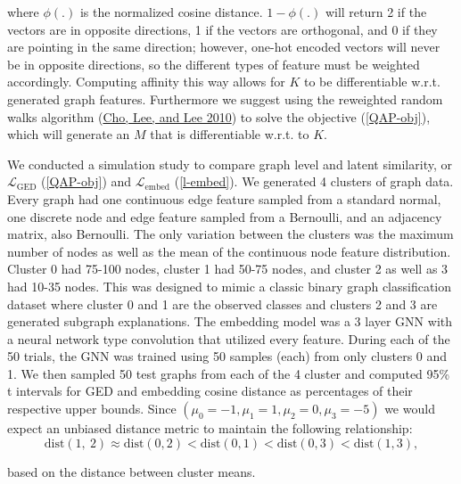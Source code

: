 \documentclass[
  11pt,
  letterpaper,
]{article}
\begin{document}
where \(\phi(.)\) is the normalized cosine distance. \(1 - \phi(.)\)
will return 2 if the vectors are in opposite directions, 1 if the
vectors are orthogonal, and 0 if they are pointing in the same
direction; however, one-hot encoded vectors will never be in opposite
directions, so the different types of feature must be weighted
accordingly. Computing affinity this way allows for \(K\) to be
differentiable w.r.t. generated graph features. Furthermore we suggest
using the reweighted random walks algorithm
(\protect\hyperlink{ref-Cho_Lee_Lee_2010}{Cho, Lee, and Lee 2010}) to
solve the objective (\ref{QAP-obj}), which will generate an \(M\) that
is differentiable w.r.t. to \(K\).

\quad We conducted a simulation study to compare graph level and latent
similarity, or \(\mathcal{L}_{\text{GED}}\) (\ref{QAP-obj}) and
\(\mathcal{L}_{\text{embed}}\) (\ref{l-embed}). We generated 4 clusters
of graph data. Every graph had one continuous edge feature sampled from
a standard normal, one discrete node and edge feature sampled from a
Bernoulli, and an adjacency matrix, also Bernoulli. The only variation
between the clusters was the maximum number of nodes as well as the mean
of the continuous node feature distribution. Cluster 0 had 75-100 nodes,
cluster 1 had 50-75 nodes, and cluster 2 as well as 3 had 10-35 nodes.
This was designed to mimic a classic binary graph classification dataset
where cluster 0 and 1 are the observed classes and clusters 2 and 3 are
generated subgraph explanations. The embedding model was a 3 layer GNN
with a neural network type convolution that utilized every feature.
During each of the 50 trials, the GNN was trained using 50 samples
(each) from only clusters 0 and 1. We then sampled 50 test graphs from
each of the 4 cluster and computed 95\% t intervals for GED and
embedding cosine distance as percentages of their respective upper
bounds. Since \((\mu_0 = -1, \mu_1 = 1, \mu_2 = 0, \mu_3 = -5)\) we
would expect an unbiased distance metric to maintain the following
relationship:\\
\begin{equation}
    \text{dist}(1,\ 2) \approx \text{dist}(0, 2) < \text{dist}(0, 1) < \text{dist}(0, 3) < \text{dist}(1, 3), 
\end{equation}

based on the distance between cluster means.
\end{document}

